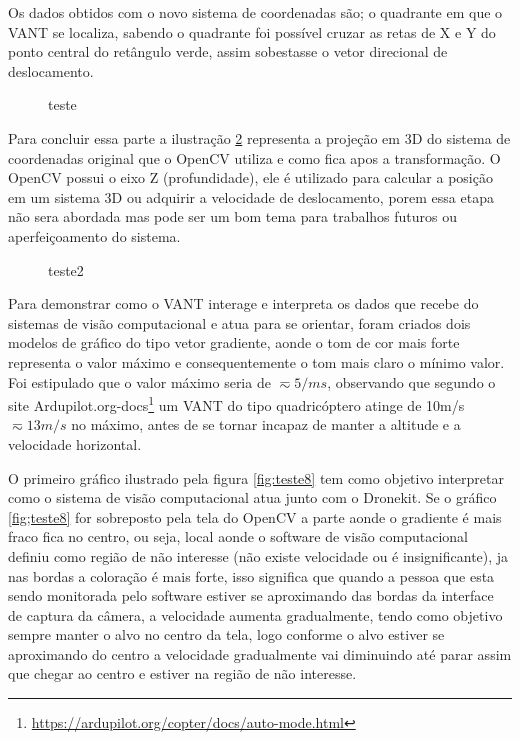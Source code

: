 Os dados obtidos com o novo sistema de coordenadas são; o quadrante em que o VANT se localiza, sabendo o quadrante foi possível cruzar as retas de X e Y do ponto central do retângulo verde, assim sobestasse o vetor direcional de deslocamento. 

\begin{figure}[H]
	\centering
	\caption{teste}
	
	\label{fig:teste}
\end{figure}

Para concluir essa parte a ilustração \ref{fig:conv} representa a projeção em 3D do sistema de coordenadas original que o OpenCV utiliza e como fica apos a transformação. O OpenCV possui o eixo Z (profundidade), ele é utilizado para calcular a posição em um sistema 3D ou adquirir a velocidade de deslocamento, porem essa etapa não sera abordada mas pode ser um bom tema para trabalhos futuros ou aperfeiçoamento do sistema.

\begin{figure}[H]
	\centering
	\caption{teste2}
	
	\label{fig:conv}
\end{figure}

Para demonstrar como o VANT interage e interpreta os dados que recebe do sistemas de visão computacional e atua para se orientar, foram criados dois modelos de gráfico do tipo vetor gradiente, aonde o tom de cor mais forte representa o valor máximo e consequentemente o tom mais claro o mínimo valor. Foi estipulado que o valor máximo seria de $\displaystyle \eqsim 5/ms$, observando que segundo o site Ardupilot.org-docs\footnote{\url{https://ardupilot.org/copter/docs/auto-mode.html}} um VANT do tipo quadricóptero atinge de 10m/s $\displaystyle \eqsim13m/s$ no máximo, antes de se tornar incapaz de manter a altitude e a velocidade horizontal. 

O primeiro gráfico ilustrado pela figura \ref{fig:teste8} tem como objetivo interpretar como o sistema de visão computacional atua junto com o Dronekit. Se o gráfico \ref{fig;teste8} for sobreposto pela tela do OpenCV a parte aonde o gradiente é mais fraco fica no centro, ou seja, local aonde o software de visão computacional definiu como região de não interesse (não existe velocidade ou é insignificante), ja nas bordas a coloração é mais forte, isso significa que quando a pessoa que esta sendo monitorada pelo software estiver se aproximando  das bordas da interface de captura da câmera, a velocidade aumenta gradualmente, tendo como objetivo sempre manter o alvo no centro da tela, logo conforme o alvo estiver se aproximando do centro a velocidade gradualmente vai diminuindo até parar assim que chegar ao centro e estiver na região de não interesse.


